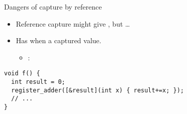 \begin{frame}[t,fragile]{Dangers of capture by reference}
  \begin{itemize}
    \item Reference capture might give , but \ldots
    \pause
    \item Has  when  
           a captured value.
      \begin{itemize}
        \item {}: 
      \end{itemize}
  \end{itemize}
\begin{lstlisting}
void f() {
  int result = 0;
  register_adder([&result](int x) { result+=x; });
  // ...
}
\end{lstlisting}
\end{frame}


